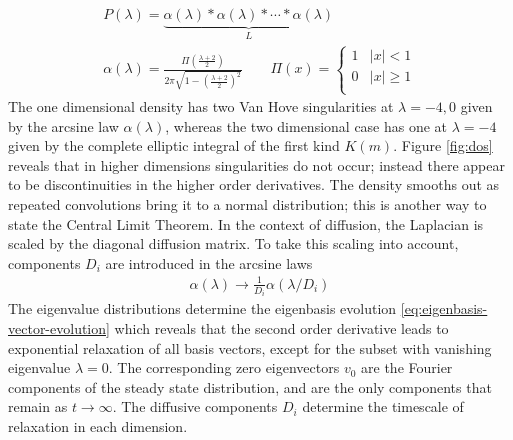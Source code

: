 \begin{align}
  P(\lambda)=\underbrace{
  \alpha(\lambda)*\alpha(\lambda)*\cdots*\alpha(\lambda)}_{L}\qquad\qquad\label{eq:mlap}\\
    \alpha(\lambda)=
      \frac{\Pi\left(\frac{\lambda+2}{2}\right)}{2\pi\sqrt{1-\left(\frac{\lambda+2}{2}\right)^2}}
    \qquad
    \Pi(x)=
      \begin{cases}
        1 & |x|<1\\
        0 & |x|\geq1\\
      \end{cases}
	\label{eq:laplacian-distribution}
\end{align}
The one dimensional density has two Van Hove singularities at $\lambda=-4,0$ given by the arcsine law $\alpha(\lambda)$, whereas the two dimensional case has one at $\lambda=-4$ given by the complete elliptic integral of the first kind $K(m)$. Figure \ref{fig:dos} reveals that in higher dimensions singularities do not occur; instead there appear to be discontinuities in the higher order derivatives. The density smooths out as repeated convolutions bring it to a normal distribution; this is another way to state the Central Limit Theorem. In the context of diffusion, the Laplacian is scaled by the diagonal diffusion matrix. To take this scaling into account, components $D_i$ are introduced in the arcsine laws
\begin{align}
	\alpha(\lambda) \rightarrow \frac{1}{D_i}\alpha(\lambda/D_i)
\end{align}
The eigenvalue distributions determine the eigenbasis evolution  \eqref{eq:eigenbasis-vector-evolution} which reveals that the second order derivative leads to exponential relaxation of all basis vectors, except for the subset with vanishing eigenvalue $\lambda=0$. The corresponding zero eigenvectors $v_0$ are the Fourier components of the steady state distribution, and are the only components that remain as $t\rightarrow\infty$. The diffusive components $D_i$ determine the timescale of relaxation in each dimension.


